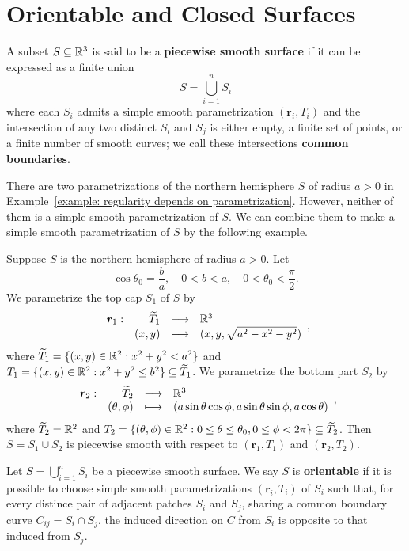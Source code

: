\section{Orientable and Closed Surfaces}
\begin{definitionenv}
    A subset $S\subseteq \mathbb{R}^3$ is said to be a \textbf{piecewise smooth surface} if it can be expressed as a finite union
    $$ S = \bigcup_{i=1}^n S_i $$
    where each $S_i$ admits a simple smooth parametrization $(\bm r_i, T_i)$ and the intersection of any two distinct $S_i$ and $S_j$ is either empty, a finite set of points, or a finite number of smooth curves; we call these intersections \textbf{common boundaries}.
\end{definitionenv}
\begin{remarkenv}
    There are two parametrizations of the northern hemisphere $S$ of radius $a>0$ in Example~\ref{example: regularity depends on parametrization}. However, neither of them is a simple smooth parametrization of $S$. We can combine them to make a simple smooth parametrization of $S$ by the following example.
\end{remarkenv}
\begin{exampleenv}\label{example: orientable surface}
     Suppose $S$ is the northern hemisphere of radius $a>0$. Let
     $$ \cos \theta_0 = \frac{b}{a}, \quad 0< b < a,\quad 0 < \theta_0 < \frac{\pi}{2}. $$
    We parametrize the top cap $S_1$ of $S$ by
    $$ \begin{array}{r r c l}
        \bm r_1: & \widetilde T_1 & \longrightarrow & \mathbb{R}^3\\
        & (x,y) & \longmapsto & (x,y,\sqrt{a^2 - x^2 - y^2})
    \end{array}, $$
    where $\widetilde T_1 = \{(x,y)\in \mathbb{R}^2: x^2 + y^2 < a^2\}$ and $T_1 = \{(x,y)\in \mathbb{R}^2: x^2 + y^2 \le b^2\} \subseteq \widetilde T_1$. We parametrize the bottom part $S_2$ by
    $$ \begin{array}{r r c l}
        \bm r_2: & \widetilde T_2 & \longrightarrow & \mathbb{R}^3\\
        & (\theta, \phi) & \longmapsto & (a\sin\theta\cos\phi, a\sin\theta\sin\phi, a\cos\theta)
    \end{array}, $$
    where $\widetilde T_2 = \mathbb{R}^2$ and $T_2 = \{(\theta, \phi)\in \mathbb{R}^2: 0 \le \theta \le \theta_0, 0 \le \phi < 2\pi\} \subseteq \widetilde T_2$. 
    Then $S=S_1\cup S_2$ is piecewise smooth with respect to $(\bm r_1, T_1)$ and $(\bm r_2, T_2)$.
\end{exampleenv}
\begin{definitionenv}
    Let $S=\displaystyle \bigcup_{i=1}^n S_i$ be a piecewise smooth surface. We say $S$ is \textbf{orientable} if it is possible to choose simple smooth parametrizations $(\bm r_i, T_i)$ of $S_i$ such that, for every distince pair of adjacent patches $S_i$ and $S_j$, sharing a common boundary curve $C_{ij} = S_i \cap S_j$, the induced direction on $C$ from $S_i$ is opposite to that induced from $S_j$.
\end{definitionenv}
